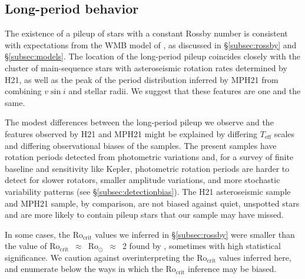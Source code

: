 \documentclass[trackchanges,twocolumn]{aastex631}
\newcommand{\rocrit}{$\mathrm{Ro_{crit}}$\xspace}
\newcommand{\rosun}{$\mathrm{Ro_{\odot}}$\xspace}
\newcommand{\hall}{H21\xspace}
\newcommand{\masuda}{MPH21\xspace}
\newcommand{\teff}{\ensuremath{T_{\mathrm{eff}}}\xspace}
\newcommand{\vsini}{\ensuremath{v \sin i}\xspace}
\begin{document}
\subsection{Long-period behavior} \label{subsec:longperiod}

The existence of a pileup of stars with a constant Rossby number is consistent with expectations from the WMB model of \citet{vanSaders2016, vanSaders2019}, as discussed in \S\ref{subsec:rossby} and \S\ref{subsec:models}. The location of the long-period pileup coincides closely with the cluster of main-sequence stars with asteroseismic rotation rates determined by \hall, as well as the peak of the period distribution inferred by \masuda from combining \vsini and stellar radii. We suggest that these features are one and the same.

The modest differences between the long-period pileup we observe and the features observed by \hall and \masuda might be explained by differing \teff scales and differing observational biases of the samples. The present samples have rotation periods detected from photometric variations and, for a survey of finite baseline and sensitivity like Kepler, photometric rotation periods are harder to detect for slower rotators, smaller amplitude variations, and more stochastic variability patterns (see \S\ref{subsec:detectionbias}). The \hall asteroseismic sample and \masuda sample, by comparison, are not biased against quiet, unspotted stars and are more likely to contain pileup stars that our sample may have missed.

In some cases, the \rocrit values we inferred in \S\ref{subsec:rossby} were smaller than the value of \rocrit~$\approx$~\rosun~$\approx$~2 found by \citet{vanSaders2016,vanSaders2019}, sometimes with high statistical significance. We caution against overinterpreting the \rocrit values inferred here, and enumerate below the ways in which the \rocrit inference may be biased.
\end{document}
